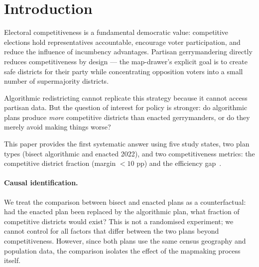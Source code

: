 \section{Introduction}

Electoral competitiveness is a fundamental democratic value: competitive
elections hold representatives accountable, encourage voter participation,
and reduce the influence of incumbency advantages.
Partisan gerrymandering directly reduces competitiveness by design ---
the map-drawer's explicit goal is to create safe districts for their party
while concentrating opposition voters into a small number of supermajority
districts.

Algorithmic redistricting cannot replicate this strategy because it cannot
access partisan data.
But the question of interest for policy is stronger: do algorithmic plans
produce \emph{more} competitive districts than enacted gerrymanders,
or do they merely avoid making things worse?

This paper provides the first systematic answer using five study states,
two plan types (bisect algorithmic and enacted 2022), and two competitiveness
metrics: the competitive district fraction (margin $< 10$ pp) and the
efficiency gap~\citep{stephanopoulos2015partisan}.

\paragraph{Causal identification.}
We treat the comparison between bisect and enacted plans as a
counterfactual: had the enacted plan been replaced by the algorithmic plan,
what fraction of competitive districts would exist?
This is not a randomised experiment; we cannot control for all factors that
differ between the two plans beyond competitiveness.
However, since both plans use the same census geography and population data,
the comparison isolates the effect of the mapmaking process itself.
